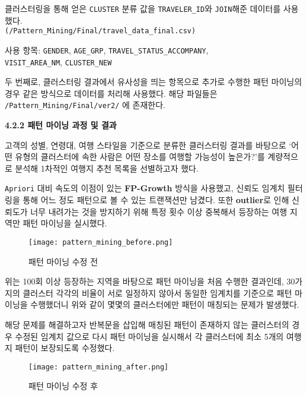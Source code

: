 \documentclass[sigconf]{acmart}
\begin{document}
\begin{CJK}{UTF8}{mj}
클러스터링을 통해 얻은 \texttt{CLUSTER} 분류 값을 \texttt{TRAVELER\_ID}와 \texttt{JOIN}해준 데이터를 사용했다. \\\texttt{(/Pattern\_Mining/Final/travel\_data\_final.csv)}

사용 항목: \texttt{GENDER}, \texttt{AGE\_GRP}, \texttt{TRAVEL\_STATUS\_ACCOMPANY},\\\texttt{VISIT\_AREA\_NM}, \texttt{CLUSTER\_NEW}

두 번째로, 클러스터링 결과에서 유사성을 띄는 항목으로 추가로 수행한 패턴 마이닝의 경우 같은 방식으로 데이터를 처리해 사용했다. 해당 파일들은 \texttt{/Pattern\_Mining/Final/ver2/} 에 존재한다.

\vspace{0.5em}
\noindent\textbf{4.2.2 패턴 마이닝 과정 및 결과}\par

고객의 성별, 연령대, 여행 스타일을 기준으로 분류한 클러스터링 결과를 바탕으로 ‘어떤 유형의 클러스터에 속한 사람은 어떤 장소를 여행할 가능성이 높은가?’를 계량적으로 분석해 1차적인 여행지 추천 목록을 선별하고자 했다.

\texttt{Apriori} 대비 속도의 이점이 있는 \textbf{FP-Growth} 방식을 사용했고, 신뢰도 임계치 필터링을 통해 어느 정도 패턴으로 볼 수 있는 트랜잭션만 남겼다. 또한 \textbf{outlier}로 인해 신뢰도가 너무 내려가는 것을 방지하기 위해 특정 횟수 이상 중복해서 등장하는 여행 지역만 패턴 마이닝을 실시했다.

\begin{figure}[H]
  \centering
  \texttt{[image: pattern\_mining\_before.png]}
  \caption{패턴 마이닝 수정 전}
  \label{fig:pattern_mining_before}
\end{figure}

\vspace{0.5em}

위는 100회 이상 등장하는 지역을 바탕으로 패턴 마이닝을 처음 수행한 결과인데, 30가지의 클러스터 각각의 비율이 서로 일정하지 않아서 동일한 임계치를 기준으로 패턴 마이닝을 수행했더니 위와 같이 몇몇의 클러스터에만 패턴이 매칭되는 문제가 발생했다.

해당 문제를 해결하고자 반복문을 삽입해 매칭된 패턴이 존재하지 않는 클러스터의 경우 수정된 임계치 값으로 다시 패턴 마이닝을 실시해서 각 클러스터에 최소 5개의 여행지 패턴이 보장되도록 수정했다.

\begin{figure}[H]
  \centering
  \texttt{[image: pattern\_mining\_after.png]}
  \caption{패턴 마이닝 수정 후}
  \label{fig:pattern_mining_after}
\end{figure}


\end{CJK}
\end{document}
